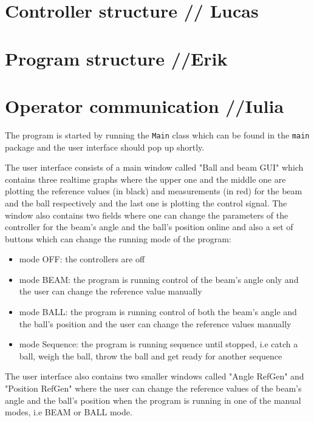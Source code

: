 \documentclass{article}
\begin{document}
\section{Controller structure // Lucas}


\section{Program structure //Erik}



\section{Operator communication //Iulia}\label{OpCom}
The program is started by running the \texttt{Main} class which can be found in the \texttt{main} package and the user interface should pop up shortly.

The user interface consists of a main window called "Ball and beam GUI" which contains three realtime graphs where the upper one and the middle one are plotting the reference values (in black) and measurements (in red) for the beam and the ball respectively and the last one is plotting the control signal. The window also contains two fields where one can change the parameters of the controller for the beam's angle and the ball's position online and also a set of buttons which can change the running mode of the program:
\begin{itemize}
\item mode OFF: the controllers are off
\item mode BEAM: the program is running control of the beam's angle only and the user can change the reference value manually
\item mode BALL: the program is running control of both the beam's angle and the ball's position and the user can change the reference values manually
\item mode Sequence: the program is running sequence until stopped, i.e catch a ball, weigh the ball, throw the ball and get ready for another sequence
\end{itemize}

The user interface also contains two smaller windows called "Angle RefGen" and "Position RefGen" where the user can change the reference values of the beam's angle and the ball's position when the program is running in one of the manual modes, i.e BEAM or BALL mode.
\end{document}
